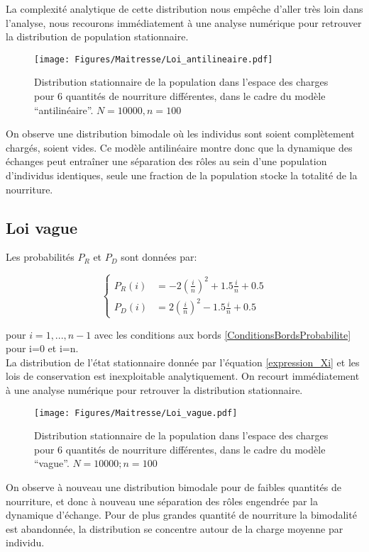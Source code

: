 La complexité analytique de cette distribution nous empêche d'aller très loin dans l'analyse, nous recourons immédiatement à une analyse numérique pour retrouver la distribution de population stationnaire.


\begin{figure}[h]
\centering
\texttt{[image: Figures/Maitresse/Loi\_antilineaire.pdf]}
\caption{Distribution stationnaire de la population dans l'espace des charges pour 6 quantités de nourriture différentes, dans le cadre du modèle ``antilinéaire''. $N=10000, n=100$}
\label{DistribAnalytiqueAnti}
\end{figure}

On observe une distribution bimodale où les individus sont soient complètement chargés, soient vides. Ce modèle antilinéaire montre donc que la dynamique des échanges peut entraîner une séparation des rôles au sein d'une population d'individus identiques, seule une fraction de la population stocke la totalité de la nourriture.


\subsection{Loi vague}
Les probabilités $P_R$ et $P_D$ sont données par:

\begin{equation}
\left \{
\begin{aligned}
P_R(i) &= -2(\frac{i}{n})^2+1.5\frac{i}{n}+0.5\\
P_D(i) &= 2(\frac{i}{n})^2-1.5\frac{i}{n}+0.5
\end{aligned}
\right.
\end{equation}

pour $i=1,...,n-1$ avec les conditions aux bords \ref{ConditionsBordsProbabilite} pour i=0 et i=n.\\

La distribution de l'état stationnaire donnée par l'équation \ref{expression_Xi} et les lois de conservation est inexploitable analytiquement. On recourt immédiatement à une analyse numérique pour retrouver la distribution stationnaire.


\begin{figure}[h]
\centering
\texttt{[image: Figures/Maitresse/Loi\_vague.pdf]}
\caption{Distribution stationnaire de la population dans l'espace des charges pour 6 quantités de nourriture différentes, dans le cadre du modèle ``vague''. $N=10000; n=100$}
\label{DistribAnalytiqueVague}
\end{figure}

On observe à nouveau une distribution bimodale pour de faibles quantités de nourriture, et donc à nouveau une séparation des rôles engendrée par la dynamique d'échange. Pour de plus grandes quantité de nourriture la bimodalité est abandonnée, la distribution se concentre autour de la charge moyenne par individu.